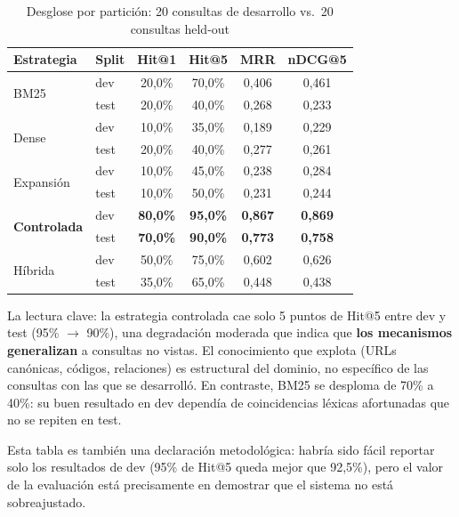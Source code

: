 \documentclass[12pt, a4paper, twoside]{report}
\begin{document}
\begin{table}[H]
\centering
\caption{Desglose por partici\'on: 20 consultas de desarrollo vs.\ 20 consultas held-out}
\label{tab:dev-test}
\begin{tabular}{llcccc}
\toprule
\textbf{Estrategia} & \textbf{Split} & \textbf{Hit@1} & \textbf{Hit@5} & \textbf{MRR} & \textbf{nDCG@5} \\
\midrule
\multirow{2}{*}{BM25}       & dev  & 20,0\% & 70,0\% & 0,406 & 0,461 \\
                            & test & 20,0\% & 40,0\% & 0,268 & 0,233 \\
\midrule
\multirow{2}{*}{Dense}      & dev  & 10,0\% & 35,0\% & 0,189 & 0,229 \\
                            & test & 20,0\% & 40,0\% & 0,277 & 0,261 \\
\midrule
\multirow{2}{*}{Expansi\'on} & dev  & 10,0\% & 45,0\% & 0,238 & 0,284 \\
                            & test & 10,0\% & 50,0\% & 0,231 & 0,244 \\
\midrule
\multirow{2}{*}{\textbf{Controlada}} & dev  & \textbf{80,0\%} & \textbf{95,0\%} & \textbf{0,867} & \textbf{0,869} \\
                            & test & \textbf{70,0\%} & \textbf{90,0\%} & \textbf{0,773} & \textbf{0,758} \\
\midrule
\multirow{2}{*}{H\'ibrida}  & dev  & 50,0\% & 75,0\% & 0,602 & 0,626 \\
                            & test & 35,0\% & 65,0\% & 0,448 & 0,438 \\
\bottomrule
\end{tabular}
\end{table}

La lectura clave: la estrategia controlada cae solo 5 puntos de Hit@5 entre dev y test (95\% $\rightarrow$ 90\%), una degradaci\'on moderada que indica que \textbf{los mecanismos generalizan} a consultas no vistas. El conocimiento que explota (URLs can\'onicas, c\'odigos, relaciones) es estructural del dominio, no espec\'ifico de las consultas con las que se desarroll\'o. En contraste, BM25 se desploma de 70\% a 40\%: su buen resultado en dev depend\'ia de coincidencias l\'exicas afortunadas que no se repiten en test.

Esta tabla es tambi\'en una declaraci\'on metodol\'ogica: habr\'ia sido f\'acil reportar solo los resultados de dev (95\% de Hit@5 queda mejor que 92,5\%), pero el valor de la evaluaci\'on est\'a precisamente en demostrar que el sistema no est\'a sobreajustado.
\end{document}
